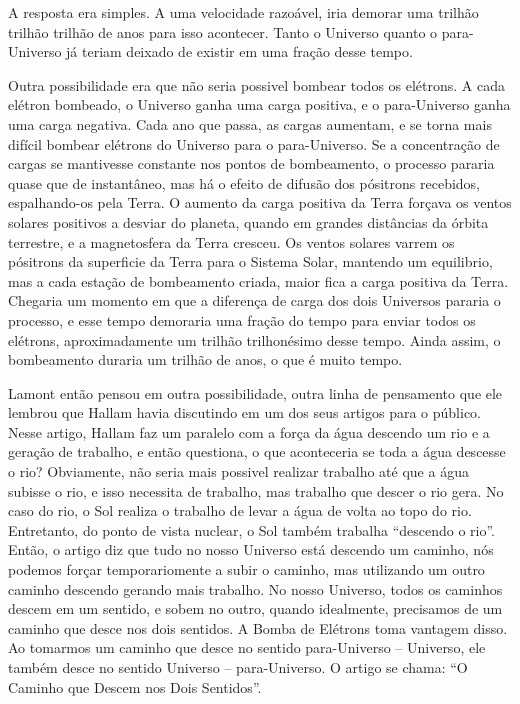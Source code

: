 \documentclass[14pt,portuguese]{extreport}
\begin{document}
	  A resposta era simples. A uma velocidade razoável, iria demorar uma trilhão trilhão trilhão 
	  de anos para isso acontecer. Tanto o Universo quanto o para-Universo já teriam deixado de 
	  existir em uma fração desse tempo.
	  
	  Outra possibilidade era que não seria possivel bombear todos os elétrons. A cada elétron 
	  bombeado, o Universo ganha uma carga positiva, e o para-Universo ganha uma carga negativa. 
	  Cada ano que passa, as cargas aumentam, e se torna mais difícil bombear elétrons do Universo 
	  para o para-Universo. Se a concentração de cargas se mantivesse constante nos pontos de 
	  bombeamento, o processo pararia quase que de instantâneo, mas há o efeito de difusão dos 
	  pósitrons recebidos, espalhando-os pela Terra. O aumento da carga positiva da Terra forçava 
	  os ventos solares positivos a desviar do planeta, quando em grandes distâncias da órbita 
	  terrestre, e a magnetosfera da Terra cresceu. Os ventos solares varrem os pósitrons da 
	  superficie da Terra para o Sistema Solar, mantendo um equilibrio, mas a cada estação de 
	  bombeamento criada, maior fica a carga positiva da Terra. Chegaria um momento em que a 
	  diferença de carga dos dois Universos pararia o processo, e esse tempo demoraria uma fração 
	  do tempo para enviar todos os elétrons, aproximadamente um trilhão trilhonésimo desse tempo. 
	  Ainda assim, o bombeamento duraria um trilhão de anos, o que é muito tempo.
	  
	  Lamont então pensou em outra possibilidade, outra linha de pensamento que ele lembrou que 
	  Hallam havia discutindo em um dos seus artigos para o público. Nesse artigo, Hallam faz um 
	  paralelo com a força da água descendo um rio e a geração de trabalho, e então questiona, 
	  o que aconteceria se toda a água descesse o rio? Obviamente, não seria mais possivel realizar 
	  trabalho até que a água subisse o rio, e isso necessita de trabalho, mas trabalho que descer 
	  o rio gera. No caso do rio, o Sol realiza o trabalho de levar a água de volta ao topo do rio.
	  Entretanto, do ponto de vista nuclear, o Sol também trabalha “descendo o rio”. Então, o 
	  artigo diz que tudo no nosso Universo está descendo um caminho, nós podemos forçar 
	  temporariomente a subir o caminho, mas utilizando um outro caminho descendo gerando mais 
	  trabalho. No nosso Universo, todos os caminhos descem em um sentido, e sobem no outro, 
	  quando idealmente, precisamos de um caminho que desce nos dois sentidos. A Bomba de Elétrons 
	  toma vantagem disso. Ao tomarmos um caminho que desce no sentido para-Universo – Universo, 
	  ele também desce no sentido Universo – para-Universo. O artigo se chama: “O Caminho que 
	  Descem nos Dois Sentidos”.
	  
\end{document}
